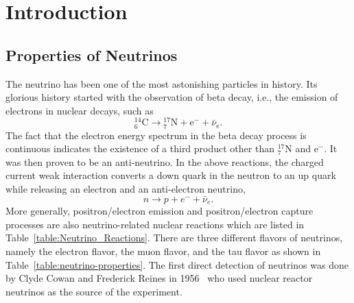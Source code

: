 \chapter{Introduction}
\label{introduction}

\section{Properties of Neutrinos}

The neutrino has been one of the most astonishing particles in history. Its glorious history started with the observation of beta decay, i.e., the emission of electrons in nuclear decays, such as
\begin{equation*}
{}^{14}_{6} \mathrm C \to {}^{17}_{7}\mathrm N + \mathrm e^{-} + \bar\nu_{\mathrm e}.
\end{equation*}
The fact that the electron energy spectrum in the beta decay process is continuous indicates the existence of a third product other than ${}^{17}_{7}\mathrm N$ and $\mathrm e^-$. It was then proven to be an anti-neutrino. In the above reactions, the charged current weak interaction converts a down quark in the neutron to an up quark while releasing an electron and an anti-electron neutrino,
\begin{equation}
n\to p + e^- + \bar \nu_e .
\end{equation}
More generally, positron/electron emission and positron/electron capture processes are also neutrino-related nuclear reactions which are listed in Table~\ref{table:Neutrino_Reactions}. There are three different flavors of neutrinos, namely the electron flavor, the muon flavor, and the tau flavor as shown in Table~\ref{table:neutrino-properties}. The first direct detection of neutrinos was done by Clyde Cowan and Frederick Reines in 1956~\cite{Cowan1956} who used nuclear reactor neutrinos as the source of the experiment.


